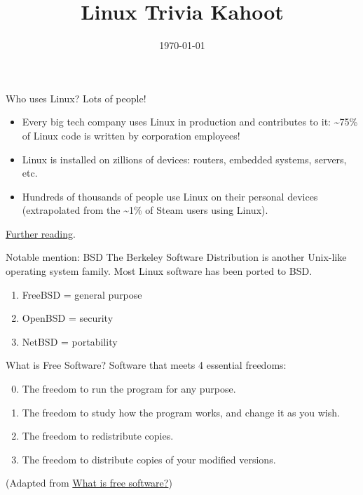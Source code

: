 \documentclass[presentation]{beamer}
\date{\today}
\title{Linux Trivia Kahoot}
\begin{document}
\maketitle

\begin{frame}[label={sec:orgd297123}]{Who uses Linux?}
Lots of people!

\begin{itemize}
\item Every big tech company uses Linux in production and contributes to it: \textasciitilde{}75\% of Linux code is written by corporation employees!
\item Linux is installed on zillions of devices: routers, embedded systems, servers, etc.
\item Hundreds of thousands of people use Linux on their personal devices (extrapolated from the \textasciitilde{}1\% of Steam users using Linux).
\end{itemize}

\href{https://findly.in/how-many-linux-users-are-there/}{Further reading}.
\end{frame}

\begin{frame}[label={sec:org828d538}]{Notable mention: BSD}
The Berkeley Software Distribution is another Unix-like operating system family. Most Linux software has been ported to BSD.

\begin{enumerate}
\item FreeBSD = general purpose
\item OpenBSD = security
\item NetBSD = portability
\end{enumerate}
\end{frame}

\begin{frame}[label={sec:org4e04856}]{What is Free Software?}
Software that meets 4 essential freedoms:

\begin{enumerate}
\setcounter{enumi}{-1}
\item The freedom to run the program for any purpose.
\item The freedom to study how the program works, and change it as you wish.
\item The freedom to redistribute copies.
\item The freedom to distribute copies of your modified versions.
\end{enumerate}

(Adapted from \href{https://www.gnu.org/philosophy/free-sw.en.html}{What is free software?})
\end{frame}
\end{document}
